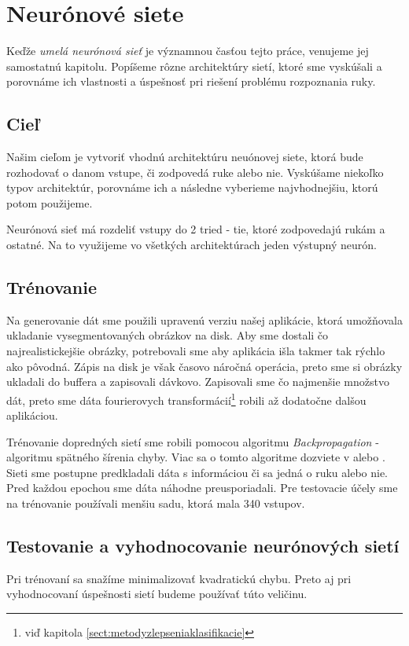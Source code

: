 \chapter{Neurónové siete}\label{chap:neuralnet}

Keďže \textit{umelá neurónová sieť} je významnou časťou tejto práce, venujeme jej samostatnú kapitolu. Popíšeme rôzne architektúry sietí, ktoré sme vyskúšali a porovnáme ich vlastnosti a úspešnosť pri riešení problému rozpoznania ruky.

\section{Cieľ}

Našim cieľom je vytvoriť vhodnú architektúru neuónovej siete, ktorá bude rozhodovať o danom vstupe, či zodpovedá ruke alebo nie. Vyskúšame niekoľko typov architektúr, porovnáme ich a následne vyberieme najvhodnejšiu, ktorú potom použijeme. 

Neurónová sieť má rozdeliť vstupy do 2 tried - tie, ktoré zodpovedajú rukám a ostatné. Na to využijeme vo všetkých architektúrach jeden výstupný neurón.

\section{Trénovanie}

Na generovanie dát sme použili upravenú verziu našej aplikácie, ktorá umožňovala ukladanie vysegmentovaných obrázkov na disk. Aby sme dostali čo najrealistickejšie obrázky, potrebovali sme aby aplikácia išla takmer tak rýchlo ako pôvodná. Zápis na disk je však časovo náročná operácia, preto sme si obrázky ukladali do buffera a zapisovali dávkovo. Zapisovali sme čo najmenšie množstvo dát, preto sme dáta fourierovych transformácií\footnote{viď kapitola \ref{sect:metodyzlepseniaklasifikacie} } robili až dodatočne dalšou aplikáciou.

Trénovanie dopredných sietí sme robili pomocou algoritmu \textit{Backpropagation} - algoritmu spätného šírenia chyby. Viac sa o tomto algoritme dozviete v \cite{haykin1999neural} alebo \cite{kvasnicka1997uvod}. Sieti sme postupne predkladali dáta s informáciou či sa jedná o ruku alebo nie. Pred každou epochou sme dáta náhodne preusporiadali. Pre testovacie účely sme na trénovanie používali menšiu sadu, ktorá mala 340 vstupov.


\section{Testovanie a vyhodnocovanie neurónových sietí}
Pri trénovaní sa snažíme minimalizovať kvadratickú chybu. Preto aj pri vyhodnocovaní úspešnosti sietí budeme používať túto veličinu.

